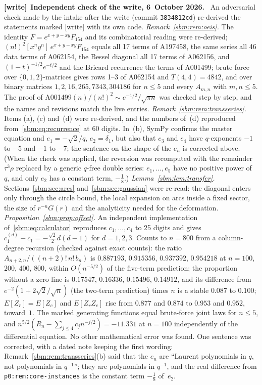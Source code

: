 \documentclass[11pt,letterpaper]{article}
\numberwithin{equation}{section}
\theoremstyle{remark}\newtheorem{remark}[theorem]{Remark}
\newcommand{\file}[1]{\nolinkurl{#1}}
\newenvironment{writenote}[1][]{\par\smallskip\begingroup\small
 \noindent\textbf{[write]}\if\relax\detokenize{#1}\relax\else~\textbf{#1.}\fi\ }%
 {\par\endgroup\smallskip}
\begin{document}
\begin{writenote}[Independent check of the write, 6~October 2026]
An adversarial check made by the intake after the write (commit
\file{3834812cd}) re-derived the statements marked [write] with its own code.
\emph{Remark~\ref{sbm:rem:oeis}.} The identity $F=e^{x+y-xy}F_{154}$ and its
combinatorial reading were re-derived; $(n!)^2[x^ny^n]\,e^{x+y-xy}F_{154}$
equals all 17 terms of A197458, the same series all 46 data terms of A062154,
the Bessel diagonal all 17 terms of A062156, and $(1-t)^{-1/2}e^{-t/2}$ and
the Bricard recurrence the terms of A001499; brute force over
$\{0,1,2\}$-matrices gives rows 1--3 of A062154 and $T(4,4)=4842$, and over
binary matrices $1,2,16,265,7343,304186$ for $n\le5$ and every $A_{m,n}$ with
$m,n\le5$. The proof of A001499$(n)/(n!)^2\sim e^{-1/2}/\sqrt{\pi n}$ was
checked step by step, and the names and revisions match the live entries.
\emph{Remark~\ref{sbm:rem:transseries}.} Items (a), (c) and~(d) were
re-derived, and the numbers of~(d) reproduced from~\eqref{sbm:eq:recurrence}
at 60 digits. In~(b), SymPy confirms the master equation and $e_1=-\sqrt2/q$,
$e_2=\delta_1$, but also that $e_3$ and $e_4$ have $q$-exponents $-1$ to $-5$
and $-1$ to $-7$; the sentence on the shape of the $e_n$ is corrected above.
(When the check was applied, the reversion was recomputed with the remainder
$\tau^3\rho$ replaced by a generic $q$-free double series: $e_1,\dots,e_5$
have no positive power of~$q$, and only $e_2$ has a constant term, $-\frac18$.)
\emph{Lemma~\ref{sbm:lem:transfer}.} Sections~\ref{sbm:sec:arcs}
and~\ref{sbm:sec:gaussian} were re-read: the diagonal enters only through the
circle bound, the local expansion on arcs inside a fixed sector, the size of
$r^{-n}G(r)$ and the analyticity needed for the deformation.
\emph{Proposition~\ref{sbm:prop:offset}.} An independent implementation
of~\eqref{sbm:eq:calculator} reproduces $c_1,\dots,c_4$ to 25 digits and
gives $c^{(d)}_1-c_1=-\frac{\sqrt2}2d(d-1)$ for $d=1,2,3$. Counts to $n=800$
from a column-degree recursion (checked against exact counts): the ratio
$A_{n+2,n}/((n+2)!\,n!\,b_n)$ is $0.887193$, $0.915356$, $0.937392$,
$0.954218$ at $n=100$, $200$, $400$, $800$, within $O(n^{-5/2})$ of the
five-term prediction; the proportion without a zero line is $0.17547$,
$0.16336$, $0.15496$, $0.14912$, and its difference from
$e^{-2}(1+2\sqrt2/\sqrt n)$ (the two-term prediction) times $n$ is a stable
$0.087$ to $0.100$; $E[Z_r]=E[Z_c]$ and $E[Z_rZ_c]$ rise from $0.877$ and
$0.874$ to $0.953$ and $0.952$, toward~$1$. The marked generating functions
equal brute-force joint laws for $n\le5$, and $n^{5/2}(R_n-\sum_{j\le4}
c_jn^{-j/2})=-11.331$ at $n=100$ independently of the differential equation.
No other mathematical error was found. One sentence was corrected, with a
dated note keeping the first wording: Remark~\ref{sbm:rem:transseries}(b)
said that the $e_n$ are ``Laurent polynomials in $q$, not polynomials in
$q^{-1}$''; they are polynomials in $q^{-1}$, and the real difference from
\file{p0:rem:core-instances} is the constant term $-\frac18$ of~$e_2$.
\end{writenote}
\end{document}
